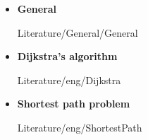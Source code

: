 \begin{frame}{\LectureFurtherLiterature}
  \begin{itemize}
    \item
      \textbf{General}
      \begin{btSect}{Literature/General/General}
        \btPrintAll
      \end{btSect}
  \end{itemize}
\end{frame}


\begin{frame}{\LectureFurtherLiterature}
  \begin{itemize}
    \item
      \textbf{Dijkstra's algorithm}
      \begin{btSect}{Literature/eng/Dijkstra}
        \btPrintAll
      \end{btSect}
    \item
      \textbf{Shortest path problem}
      \begin{btSect}{Literature/eng/ShortestPath}
        \btPrintAll
      \end{btSect}
  \end{itemize}
\end{frame}